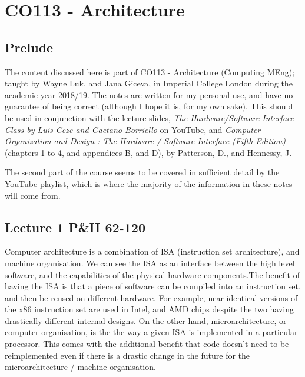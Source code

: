 \documentclass[a4paper, 12pt]{article}
\begin{document}
    \section*{CO113 - Architecture}
        \subsection*{Prelude}
            The content discussed here is part of CO113 - Architecture (Computing MEng); taught by Wayne Luk, and Jana Giceva, in Imperial College London during the academic year 2018/19. The notes are written for my personal use, and have no guarantee of being correct (although I hope it is, for my own sake). This should be used in conjunction with the lecture slides, \href{https://www.youtube.com/playlist?list=PL0oekSefhQVJdk0hSRu6sZ2teWM740NtL}{\textit{The Hardware/Software Interface Class by Luis Ceze and Gaetano Borriello}} on YouTube, and \textit{Computer Organization and Design : The Hardware / Software Interface (Fifth Edition)} (chapters 1 to 4, and appendices B, and D), by Patterson, D., and Hennessy, J.
            \medskip

            The second part of the course seems to be covered in sufficient detail by the YouTube playlist, which is where the majority of the information in these notes will come from.
        \subsection*{Lecture 1 \hfill P\&H 62-120}
            Computer architecture is a combination of ISA (instruction set architecture), and machine organisation. We can see the ISA as an interface between the high level software, and the capabilities of the physical hardware components.The benefit of having the ISA is that a piece of software can be compiled into an instruction set, and then be reused on different hardware. For example, near identical versions of the x86 instruction set are used in Intel, and AMD chips despite the two having drastically different internal designs. On the other hand, microarchitecture, or computer organisation, is the the way a given ISA is implemented in a particular processor. This comes with the additional benefit that code doesn't need to be reimplemented even if there is a drastic change in the future for the microarchitecture / machine organisation.
            \medskip
\end{document}

